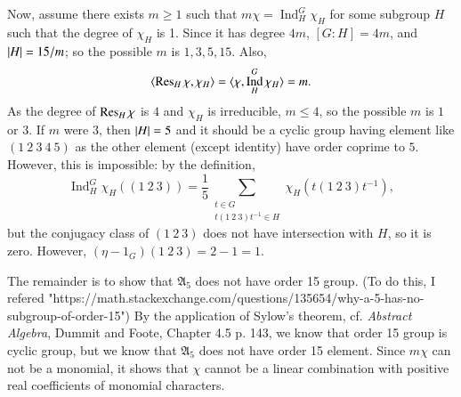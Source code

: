 \documentclass[a4paper, 12pt]{article}
\theoremstyle{Mydefinition}
\theoremstyle{Mytheorem}
\DeclareMathOperator{\Ind}{Ind}
\begin{document}
\begin{enumerate}
    Now, assume there exists $m\geq 1$ such that $m\chi=\Ind_H^G \chi_H$ for some subgroup $H$ such that the degree of $\chi_H$ is 1. Since it has degree $4m$, $[G:H]=4m$, and $\abs{H}=15/m$; so the possible $m$ is $1,3,5,15$. Also,
    \begin{equation}
        \langle \Res_H \chi, \chi_H\rangle = \langle \chi, \Ind_H^G\chi_H\rangle = m.
    \end{equation}
    As the degree of $\Res_H \chi$ is $4$ and $\chi_H$ is irreducible, $m\leq 4$, so the possible $m$ is $1$ or $3$. If $m$ were $3$, then $\abs{H}=5$ and it should be a cyclic group having element like $(1~2~3~4~5)$ as the other element (except identity) have order coprime to $5$. However, this is impossible: by the definition,
    \begin{equation}
        \Ind_H^G\chi_H((1~2~3)) = \frac{1}{5}\sum_{\substack{t\in G\\t(1~2~3)t^{-1}\in H}}\chi_H(t(1~2~3)t^{-1}),
    \end{equation}
    but the conjugacy class of $(1~2~3)$ does not have intersection with $H$, so it is zero. However, $(\eta-1_G)(1~2~3) = 2-1 = 1$.
    
    The remainder is to show that $\mathfrak{A}_5$ does not have order 15 group. (To do this, I refered "https://math.stackexchange.com/questions/135654/why-a-5-has-no-subgroup-of-order-15") By the application of Sylow's theorem, cf. \textit{Abstract Algebra}, Dummit and Foote, Chapter 4.5 p. 143, we know that order 15 group is cyclic group, but we know that $\mathfrak{A}_5$ does not have order 15 element. Since $m\chi$ can not be a monomial, it shows that $\chi$ cannot be a linear combination
    with positive real coefficients of monomial characters.
\end{enumerate}
\end{document}
